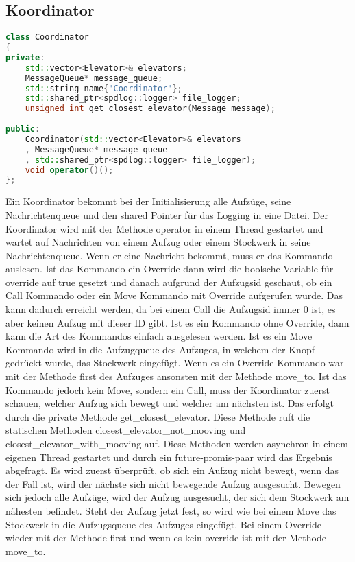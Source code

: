 \subsection{Koordinator}

\begin{lstlisting}[language=C++]
class Coordinator
{
private:
    std::vector<Elevator>& elevators;
    MessageQueue* message_queue;
    std::string name{"Coordinator"};
    std::shared_ptr<spdlog::logger> file_logger;
    unsigned int get_closest_elevator(Message message);
    
public:
    Coordinator(std::vector<Elevator>& elevators
    , MessageQueue* message_queue
    , std::shared_ptr<spdlog::logger> file_logger);
    void operator()();
};
\end{lstlisting}

\vspace{5mm}

Ein Koordinator bekommt bei der Initialisierung alle Aufzüge, seine Nachrichtenqueue und den shared Pointer für das Logging in eine Datei. Der Koordinator wird mit der Methode operator in einem Thread gestartet und wartet auf Nachrichten von einem Aufzug oder einem Stockwerk in seine Nachrichtenqueue. Wenn er eine Nachricht bekommt, muss er das Kommando auslesen. Ist das Kommando ein Override dann wird die boolsche Variable für override auf true gesetzt und danach aufgrund der Aufzugsid geschaut, ob ein Call Kommando oder ein Move Kommando mit Override aufgerufen wurde. Das kann dadurch erreicht werden, da bei einem Call die Aufzugsid immer 0 ist, es aber keinen Aufzug mit dieser ID gibt. Ist es ein Kommando ohne Override, dann kann die Art des Kommandos einfach ausgelesen werden. Ist es ein Move Kommando wird in die Aufzugqueue des Aufzuges, in welchem der Knopf gedrückt wurde, das Stockwerk eingefügt. Wenn es ein Override Kommando war mit der Methode first des Aufzuges ansonsten mit der Methode move\_to. Ist das Kommando jedoch kein Move, sondern ein Call, muss der Koordinator zuerst schauen, welcher Aufzug sich bewegt und welcher am nächsten ist. Das erfolgt durch die private Methode get\_closest\_elevator. Diese Methode ruft die statischen Methoden closest\_elevator\_not\_mooving und closest\_elevator\_with\_mooving auf. Diese Methoden werden asynchron in einem eigenen Thread gestartet und durch ein future-promis-paar wird das Ergebnis abgefragt. Es wird zuerst überprüft, ob sich ein Aufzug nicht bewegt, wenn das der Fall ist, wird der nächste sich nicht bewegende Aufzug ausgesucht. Bewegen sich jedoch alle Aufzüge, wird der Aufzug ausgesucht, der sich dem Stockwerk am nähesten befindet. Steht der Aufzug jetzt fest, so wird wie bei einem Move das Stockwerk in die Aufzugsqueue des Aufzuges eingefügt. Bei einem Override wieder mit der Methode first und wenn es kein override ist mit der Methode move\_to.